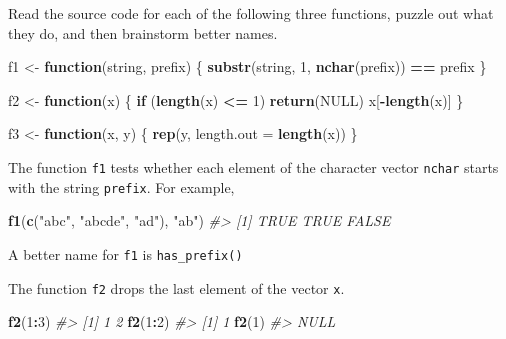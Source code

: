 \documentclass[]{book}
\newenvironment{Shaded}{\begin{snugshade}}{\end{snugshade}}
\newcommand{\CommentTok}[1]{\textcolor[rgb]{0.56,0.35,0.01}{\textit{#1}}}
\newcommand{\ControlFlowTok}[1]{\textcolor[rgb]{0.13,0.29,0.53}{\textbf{#1}}}
\newcommand{\DataTypeTok}[1]{\textcolor[rgb]{0.13,0.29,0.53}{#1}}
\newcommand{\DecValTok}[1]{\textcolor[rgb]{0.00,0.00,0.81}{#1}}
\newcommand{\KeywordTok}[1]{\textcolor[rgb]{0.13,0.29,0.53}{\textbf{#1}}}
\newcommand{\NormalTok}[1]{#1}
\newcommand{\OperatorTok}[1]{\textcolor[rgb]{0.81,0.36,0.00}{\textbf{#1}}}
\newcommand{\OtherTok}[1]{\textcolor[rgb]{0.56,0.35,0.01}{#1}}
\newcommand{\StringTok}[1]{\textcolor[rgb]{0.31,0.60,0.02}{#1}}
\theoremstyle{plain}
\theoremstyle{remark}
\begin{document}
Read the source code for each of the following three functions, puzzle
out what they do, and then brainstorm better names.

\begin{Shaded}
\begin{Highlighting}[]
\NormalTok{f1 <-}\StringTok{ }\ControlFlowTok{function}\NormalTok{(string, prefix) \{}
  \KeywordTok{substr}\NormalTok{(string, }\DecValTok{1}\NormalTok{, }\KeywordTok{nchar}\NormalTok{(prefix)) }\OperatorTok{==}\StringTok{ }\NormalTok{prefix}
\NormalTok{\}}

\NormalTok{f2 <-}\StringTok{ }\ControlFlowTok{function}\NormalTok{(x) \{}
  \ControlFlowTok{if}\NormalTok{ (}\KeywordTok{length}\NormalTok{(x) }\OperatorTok{<=}\StringTok{ }\DecValTok{1}\NormalTok{) }\KeywordTok{return}\NormalTok{(}\OtherTok{NULL}\NormalTok{)}
\NormalTok{  x[}\OperatorTok{-}\KeywordTok{length}\NormalTok{(x)]}
\NormalTok{\}}

\NormalTok{f3 <-}\StringTok{ }\ControlFlowTok{function}\NormalTok{(x, y) \{}
  \KeywordTok{rep}\NormalTok{(y, }\DataTypeTok{length.out =} \KeywordTok{length}\NormalTok{(x))}
\NormalTok{\}}
\end{Highlighting}
\end{Shaded}

The function \texttt{f1} tests whether each element of the character
vector \texttt{nchar} starts with the string \texttt{prefix}. For
example,

\begin{Shaded}
\begin{Highlighting}[]
\KeywordTok{f1}\NormalTok{(}\KeywordTok{c}\NormalTok{(}\StringTok{"abc"}\NormalTok{, }\StringTok{"abcde"}\NormalTok{, }\StringTok{"ad"}\NormalTok{), }\StringTok{"ab"}\NormalTok{)}
\CommentTok{#> [1]  TRUE  TRUE FALSE}
\end{Highlighting}
\end{Shaded}

A better name for \texttt{f1} is \texttt{has\_prefix()}

The function \texttt{f2} drops the last element of the vector
\texttt{x}.

\begin{Shaded}
\begin{Highlighting}[]
\KeywordTok{f2}\NormalTok{(}\DecValTok{1}\OperatorTok{:}\DecValTok{3}\NormalTok{)}
\CommentTok{#> [1] 1 2}
\KeywordTok{f2}\NormalTok{(}\DecValTok{1}\OperatorTok{:}\DecValTok{2}\NormalTok{)}
\CommentTok{#> [1] 1}
\KeywordTok{f2}\NormalTok{(}\DecValTok{1}\NormalTok{)}
\CommentTok{#> NULL}
\end{Highlighting}
\end{Shaded}
\end{document}
